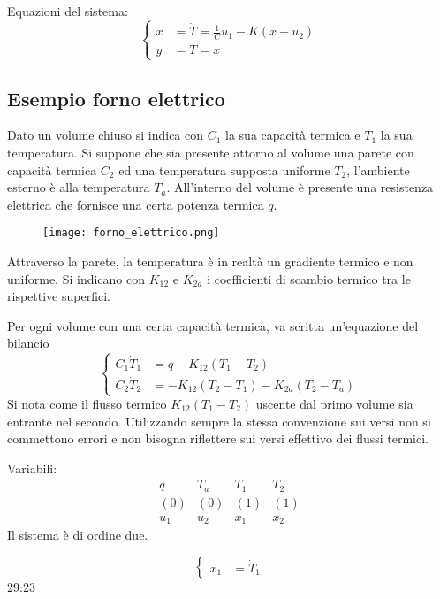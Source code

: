 Equazioni del sistema:
$$\left\{\begin{aligned}
\dot{x} &=  \dot{T} = \frac{1}{C}u_1-K(x-u_2) \\
y &= T = x
\end{aligned}\right.$$

\subsection{Esempio forno elettrico}
Dato un volume chiuso si indica con $C_1$ la sua capacità termica e $T_1$ la
sua temperatura.
Si suppone che sia presente attorno al volume una parete con capacità termica
$C_2$ ed una temperatura supposta uniforme $T_2$, l'ambiente esterno è alla
temperatura $T_a$.
All'interno del volume è presente una resistenza elettrica che fornisce una
certa potenza termica $q$.

\begin{figure}[h]
 \centering
 \texttt{[image: forno\_elettrico.png]}
 \label{Fig.:forno_elettrico}
\end{figure}

Attraverso la parete, la temperatura è in realtà un gradiente termico e non
uniforme.
Si indicano con $K_{12}$ e $K_{2a}$ i coefficienti di scambio termico tra le
rispettive superfici.

Per ogni volume con una certa capacità termica, va scritta un'equazione del
bilancio
$$\left\{\begin{aligned}
C_1\dot T_1 &= q - K_{12}(T_1-T_2)\\
C_2\dot{T}_2 &= -K_{12}(T_2-T_1) - K_{2a}(T_2-T_a)
\end{aligned}\right.$$
Si nota come il flusso termico $K_{12}(T_1-T_2)$ uscente dal primo volume sia
entrante nel secondo.
Utilizzando sempre la stessa convenzione sui versi non si commettono errori e
non bisogna riflettere sui versi effettivo dei flussi termici.

Variabili:
$$\begin{matrix}
q & T_a & T_1 & T_2 \\
(0) & (0) & (1) & (1) \\
u_1 & u_2 & x_1 & x_2
\end{matrix}$$
Il sistema è di ordine due.

$$\left\{\begin{aligned}
\dot x_1 &= \dot{T}_1
\end{aligned}\right.$$
29:23
